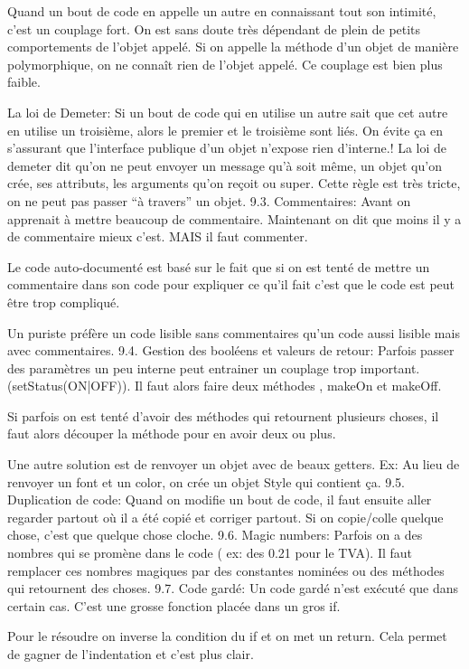 Quand un bout de code en appelle un autre en connaissant tout son intimité, c’est un couplage fort. On est sans doute très dépendant de plein de petits comportements de l’objet appelé.
Si on appelle la méthode d’un objet de manière polymorphique, on ne connaît rien de l’objet appelé. Ce couplage est bien plus faible.

La loi de Demeter: Si un bout de code qui en utilise un autre sait que cet autre en utilise un troisième, alors le premier et le troisième sont liés. On évite ça en s’assurant que l’interface publique d’un objet n’expose rien d’interne.!
La loi de demeter dit qu’on ne peut envoyer un message qu’à soit même, un objet qu’on crée, ses attributs, les arguments qu’on reçoit ou super. Cette règle est très tricte, on ne peut pas passer “à travers” un objet.
9.3. Commentaires:
Avant on apprenait à mettre beaucoup de commentaire. Maintenant on dit que moins il y a de commentaire mieux c’est. MAIS il faut commenter.

Le code auto-documenté est basé sur le fait que si on est tenté de mettre un commentaire dans son code pour expliquer ce qu’il fait c’est que le code est peut être trop compliqué.

Un puriste préfère un code lisible sans commentaires qu’un code aussi lisible mais avec commentaires.
9.4. Gestion des booléens et valeurs de retour:
Parfois passer des paramètres un peu interne peut entrainer un couplage trop important. (setStatus(ON|OFF)). Il faut alors faire deux méthodes , makeOn et makeOff.

Si parfois on est tenté d’avoir des méthodes qui retournent plusieurs choses, il faut alors découper la méthode pour en avoir deux ou plus.

Une autre solution est de renvoyer un objet avec de beaux getters. Ex: Au lieu de renvoyer un font et un color, on crée un objet Style qui contient ça.
9.5. Duplication de code:
Quand on modifie un bout de code, il faut ensuite aller regarder partout où il a été copié et corriger partout. Si on copie/colle quelque chose, c’est que quelque chose cloche.
9.6. Magic numbers:
Parfois on a des nombres qui se promène dans le code ( ex: des 0.21 pour le TVA).
Il faut remplacer ces nombres magiques par des constantes nominées ou des méthodes qui retournent des choses.
9.7. Code gardé:
Un code gardé n’est exécuté que dans certain cas. C’est une grosse fonction placée dans un gros if.

Pour le résoudre on inverse la condition du if et on met un return.
Cela permet de gagner de l’indentation et c’est plus clair.